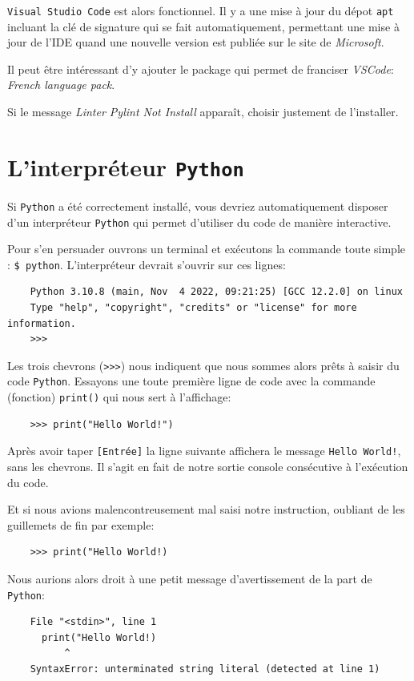 \documentclass[a4paper,12pt]{book}
\begin{document}
\texttt{Visual Studio Code} est alors fonctionnel. Il y a une mise à jour du dépot \texttt{apt} incluant la clé de signature qui se fait automatiquement, permettant une mise à jour de l'IDE  quand une nouvelle version est publiée sur le site de \textit{Microsoft}.
\medskip

Il peut être intéressant d'y ajouter le package qui permet de franciser \textit{VSCode}: \textit{French language pack}.
\medskip

Si le message \textit{Linter Pylint Not Install} apparaît, choisir justement de l'installer.
\medskip

\section{L'interpréteur \texttt{Python}}
Si \texttt{Python} a été correctement installé, vous devriez automatiquement disposer d'un interpréteur \texttt{Python} qui permet d'utiliser du code de manière interactive.
\medskip

Pour s'en persuader ouvrons un terminal et exécutons la commande toute simple : \verb|$ python|. L'interpréteur devrait s'ouvrir sur ces lignes:
\begin{verbatim}
    Python 3.10.8 (main, Nov  4 2022, 09:21:25) [GCC 12.2.0] on linux
    Type "help", "copyright", "credits" or "license" for more information.
    >>> 
\end{verbatim}
\medskip

Les trois chevrons (\verb|>>>|) nous indiquent que nous sommes alors prêts à saisir du code \texttt{Python}. Essayons une toute première ligne de code avec la commande (fonction) \texttt{print()} qui nous sert à l'affichage:
\begin{verbatim}
    >>> print("Hello World!")
\end{verbatim}
\medskip

Après avoir taper \texttt{[Entrée]} la ligne suivante affichera le message \texttt{Hello World!}, sans les chevrons. Il s'agit en fait de notre sortie console consécutive à l'exécution du code.
\medskip

Et si nous avions malencontreusement mal saisi notre instruction, oubliant de les guillemets de fin par exemple:
\begin{verbatim}
    >>> print("Hello World!)
\end{verbatim}
\medskip

Nous aurions alors droit à une petit message d'avertissement de la part de \texttt{Python}:
\begin{verbatim}
    File "<stdin>", line 1
      print("Hello World!)
          ^
    SyntaxError: unterminated string literal (detected at line 1)
\end{verbatim}
\end{document}
